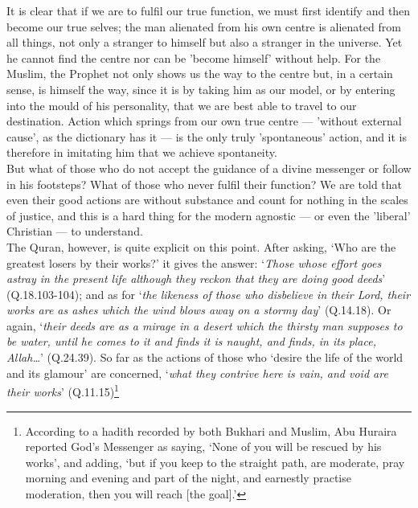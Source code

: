 \documentclass[10pt, twoside]{book}
\begin{document}
It is clear that if we are to fulfil our true function, we must first identify and then become our 
true selves; the man alienated from his own centre is alienated from all things, not only a stranger 
to himself but also a stranger in the universe. Yet he cannot find the centre nor can be 'become 
himself' without help. For the Muslim, the Prophet not only shows us the way to the centre but, in a 
certain sense, is himself the way, since it is by taking him as our model, or by entering into the 
mould of his personality, that we are best able to travel to our destination. Action which springs 
from our own true centre --- 'without external cause', as the dictionary has it --- is the only truly 
'spontaneous' action, and it is therefore in imitating him that we achieve spontaneity. \\

But what of those who do not accept the guidance of a divine messenger or follow in his footsteps? 
What of those who never fulfil their function? We are told that even their good actions are without 
substance and count for nothing in the scales of justice, and this is a hard thing for the modern 
agnostic --- or even the 'liberal' Christian --- to understand. \\

The Quran, however, is quite explicit on this point. After asking, `Who are the greatest losers by 
their works?' it gives the answer: `\emph{Those whose effort goes astray in the present life although they 
reckon that they are doing good deeds}' (Q.18.103-104); and as for `\emph{the likeness of those who 
disbelieve in their Lord, their works are as ashes which the wind blows away on a stormy day}' 
(Q.14.18). Or again, `\emph{their deeds are as a mirage in a desert which the thirsty man supposes to be 
water, until he comes to it and finds it is naught, and finds, in its place, Allah\ldots{}}' (Q.24.39). So 
far as the actions of those who `desire the life of the world and its glamour' are concerned, `\emph{what 
they contrive here is vain, and void are their works}' (Q.11.15)\footnote{According to a hadith recorded by both Bukhari and Muslim, Abu Huraira reported God's Messenger as 
saying, `None of you will be rescued by his works', and adding, `but if you keep to the straight 
path, are moderate, pray morning and evening and part of the night, and earnestly practise 
moderation, then you will reach [the goal].'} \\
\end{document}
